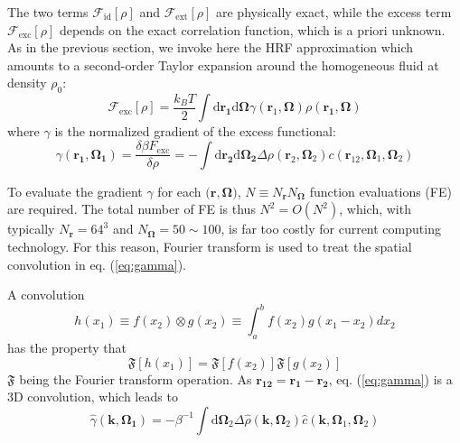 The two terms $\mathcal{F}_{\mathrm{id}}[\rho]$ and $\mathcal{F}_{\mathrm{ext}}[\rho]$
are physically exact, while the excess term $\mathcal{F}_{\mathrm{exc}}[\rho]$
depends on the exact correlation function, which is a priori unknown.
As in the previous section, we invoke here the \acs{HRF} approximation
which amounts to a second-order Taylor expansion around the homogeneous
fluid at density $\rho_{0}$:
\begin{equation}
\mathcal{F}_{\mathrm{exc}}[\rho]=\frac{k_{B}T}{2}\int\mathrm{d}\mathbf{r_{1}}\mathrm{d}\mathbf{\mathbf{\Omega}}\gamma(\mathbf{r}_{1},\mathbf{\mathbf{\mathbf{\mathbf{\Omega}}}})\rho(\mathbf{r_{1}},\mathbf{\mathbf{\mathbf{\mathbf{\Omega}}}})\label{eq:fexc}
\end{equation}
where $\gamma$ is the normalized gradient of the excess functional:
\begin{equation}
\gamma(\mathbf{r_{1}},\mathbf{\Omega_{1}})=\frac{\delta\beta F_{\mathrm{exc}}}{\delta\rho}=-\int\mathrm{d}\mathbf{r_{2}}\mathrm{d}\mathbf{\Omega_{2}}\Delta\rho(\mathbf{r}_{2},\mathbf{\Omega}_{2})c(\mathbf{r}_{12},\mathbf{\Omega}_{1},\mathbf{\Omega}_{2})\label{eq:gamma}
\end{equation}

To evaluate the gradient $\gamma$ for each $\mathbf{(r},\mathbf{\Omega})$,
$N\equiv N_{\mathbf{r}}N_{\mathbf{\Omega}}$ function evaluations
(\acs{FE}) are required. The total number of \acs{FE} is thus $N^{2}=O(N^{2})$,
which, with typically $N_{\mathbf{r}}=64^{3}$ and $N_{\mathbf{\Omega}}=50\sim100$,
is far too costly for current computing technology. For this reason,
Fourier transform is used to treat the spatial convolution in eq.
(\ref{eq:gamma}).

A convolution
\begin{equation}
h(x_{1})\equiv f(x_{2})\otimes g(x_{2})\equiv\int_{a}^{b}f(x_{2})g(x_{1}-x_{2})dx_{2}\label{eq:convolution-1}
\end{equation}
has the property that
\begin{equation}
\mathfrak{F}[h(x_{1})]=\mathfrak{F}[f(x_{2})]\mathfrak{F}[g(x_{2})]\label{eq:convolution-2}
\end{equation}
$\mathfrak{F}$ being the Fourier transform operation. As $\mathbf{r_{12}}=\mathbf{r_{1}}-\mathbf{r_{2}}$,
eq. (\ref{eq:gamma}) is a 3D convolution, which leads to
\begin{equation}
\hat{\gamma}(\mathbf{k},\mathbf{\Omega_{1}})=-\beta^{-1}\int\mathrm{d}\mathbf{\Omega}_{2}\Delta\hat{\rho}(\mathbf{k},\mathbf{\Omega}_{2})\hat{c}(\mathbf{k},\mathbf{\Omega}_{1},\mathbf{\Omega}_{2})\label{eq:gamma-k}
\end{equation}

